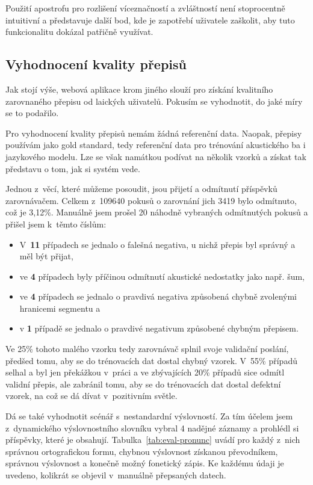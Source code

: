 Použití apostrofu pro rozlišení víceznačností a zvláštností není stoprocentně
intuitivní a představuje další bod, kde je zapotřebí uživatele zaškolit, aby
tuto funkcionalitu dokázal patřičně využívat.

\subsection{Vyhodnocení kvality přepisů}

Jak stojí výše, webová aplikace krom jiného slouží pro získání kvalitního
zarovnaného přepisu od laických uživatelů. Pokusím se vyhodnotit, do jaké míry
se to podařilo.

Pro vyhodnocení kvality přepisů nemám žádná referenční data. Naopak, přepisy
používám jako gold standard, tedy referenční data pro trénování akustického ba i
jazykového modelu. Lze se však namátkou podívat na několik vzorků a získat tak
představu o tom, jak si systém vede.

Jednou z~věcí, které můžeme posoudit, jsou přijetí a odmítnutí příspěvků
zarovnávačem. Celkem z~109640 pokusů o zarovnání jich 3419 bylo odmítnuto, což
je 3,12\%. Manuálně jsem prošel 20 náhodně vybraných odmítnutých pokusů a
přišel jsem k~těmto číslům:
\begin{itemize}
\item{
    V~\textbf{11} případech se jednalo o falešná negativa, u nichž přepis byl
    správný a měl být přijat,
}
\item{
    ve \textbf{4} případech byly příčinou odmítnutí akustické nedostatky jako
    např. šum,
}
\item{
    ve \textbf{4} případech se jednalo o pravdivá negativa způsobená chybně
    zvolenými hranicemi segmentu a
}
\item{
     v \textbf{1} případě se jednalo o pravdivé negativum způsobené chybným
    přepisem.
}
\end{itemize}

Ve 25\% tohoto malého vzorku tedy zarovnávač splnil svoje validační
poslání, předšed tomu, aby se do trénovacích dat dostal chybný vzorek. V~55\%
případů selhal a byl jen překážkou v~práci a ve zbývajících 20\%
případů sice odmítl validní přepis, ale zabránil tomu, aby se do trénovacích dat
dostal defektní vzorek, na což se dá dívat v~pozitivním světle.

Dá se také vyhodnotit scénář s~nestandardní výslovností. Za tím účelem jsem
z~dynamického výslovnostního slovníku vybral 4 nadějné záznamy a prohlédl si
příspěvky, které je obsahují. Tabulka~\ref{tab:eval-pronunc} uvádí pro každý
z~nich správnou ortografickou formu, chybnou výslovnost získanou převodníkem,
správnou výslovnost a konečně možný fonetický zápis. Ke každému údaji je uvedeno,
kolikrát se objevil v~manuálně přepsaných datech.

